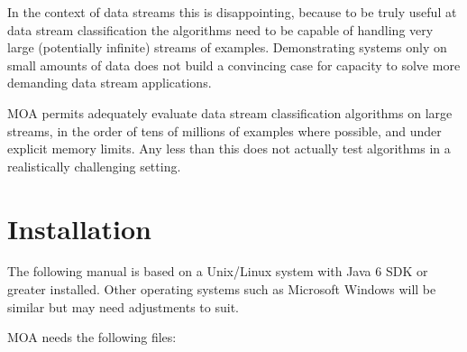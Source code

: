 \documentclass[a4paper,12pt,twoside]{book}
\begin{document}
In the context of data streams this is disappointing, because to be
truly useful at data stream classification the algorithms need to be capable of 
handling very large (potentially infinite) streams of examples. Demonstrating 
systems only on small amounts of data does not build a convincing case for capacity
to solve more demanding data stream applications.

    MOA permits adequately evaluate data stream
classification algorithms on large streams, in the order
of tens of millions of examples where possible, and under explicit memory
limits. Any less than this does not actually test algorithms in a realistically
challenging setting. 

\chapter{Installation}

The following manual is based on a Unix/Linux system with Java 6 SDK or greater installed. 
Other operating systems such as Microsoft Windows will be similar but may need adjustments to suit.

MOA needs the following files:
\end{document}
